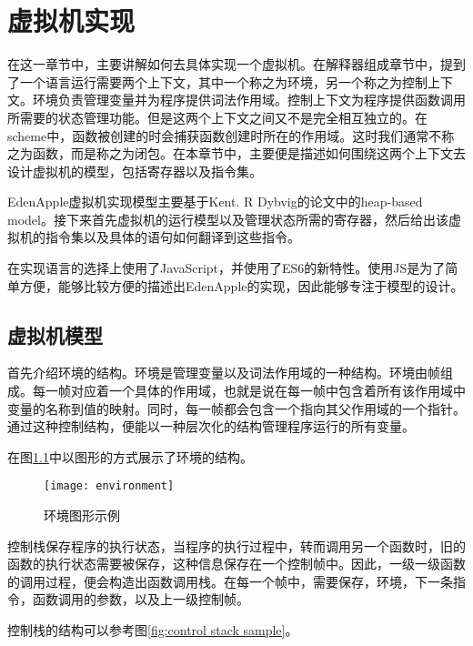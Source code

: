 
{
    \let\centering\raggedright
    \chapter{虚拟机实现}
    \thispagestyle{hubu@thesis}
}
\label{ch:vm impl}

在这一章节中，主要讲解如何去具体实现一个虚拟机。在解释器组成章节中，提到了一个语言运行需要两个上下文，其中一个称之为环境，另一个称之为控制上下文。环境负责管理变量并为程序提供词法作用域。控制上下文为程序提供函数调用所需要的状态管理功能。但是这两个上下文之间又不是完全相互独立的。在scheme中，函数被创建的时会捕获函数创建时所在的作用域。这时我们通常不称之为函数，而是称之为闭包。在本章节中，主要便是描述如何围绕这两个上下文去设计虚拟机的模型，包括寄存器以及指令集。

EdenApple虚拟机实现模型主要基于Kent. R Dybvig的论文\cite{dybvig87timpl}中的heap-based model。接下来首先虚拟机的运行模型以及管理状态所需的寄存器，然后给出该虚拟机的指令集以及具体的语句如何翻译到这些指令。

在实现语言的选择上使用了JavaScript，并使用了ES6的新特性。使用JS是为了简单方便，能够比较方便的描述出EdenApple的实现，因此能够专注于模型的设计。

\section{虚拟机模型}

首先介绍环境的结构。环境是管理变量以及词法作用域的一种结构。环境由帧组成。每一帧对应着一个具体的作用域，也就是说在每一帧中包含着所有该作用域中变量的名称到值的映射。同时，每一帧都会包含一个指向其父作用域的一个指针。通过这种控制结构，便能以一种层次化的结构管理程序运行的所有变量。

在图\ref{fig:env sample}中以图形的方式展示了环境的结构。

\begin{figure}
\begin{center}
\texttt{[image: environment]}
\end{center}
\caption{环境图形示例}
\label{fig:env sample}
\end{figure}

控制栈保存程序的执行状态，当程序的执行过程中，转而调用另一个函数时，旧的函数的执行状态需要被保存，这种信息保存在一个控制帧中。因此，一级一级函数的调用过程，便会构造出函数调用栈。在每一个帧中，需要保存，环境，下一条指令，函数调用的参数，以及上一级控制帧。

控制栈的结构可以参考图\ref{fig:control stack sample}。

